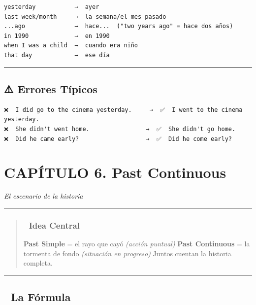 \documentclass[
  spanish,
  letterpaper,
]{scrbook}
\begin{document}
\begin{verbatim}
yesterday           →  ayer
last week/month     →  la semana/el mes pasado
...ago              →  hace...  ("two years ago" = hace dos años)
in 1990             →  en 1990
when I was a child  →  cuando era niño
that day            →  ese día
\end{verbatim}

\begin{center}\rule{0.5\linewidth}{0.5pt}\end{center}

\section{⚠️ Errores Típicos}\label{errores-tuxedpicos-2}

\begin{verbatim}
❌  I did go to the cinema yesterday.     →  ✅  I went to the cinema yesterday.
❌  She didn't went home.                →  ✅  She didn't go home.
❌  Did he came early?                   →  ✅  Did he come early?
\end{verbatim}

\chapter{CAPÍTULO 6. Past
Continuous}\label{capuxedtulo-6.-past-continuous}

\emph{El escenario de la historia}

\begin{center}\rule{0.5\linewidth}{0.5pt}\end{center}

\begin{quote}
\subsection{🎯 Idea Central}\label{idea-central-4}

\textbf{Past Simple} = el rayo que cayó \emph{(acción puntual)}
\textbf{Past Continuous} = la tormenta de fondo \emph{(situación en
progreso)} Juntos cuentan la historia completa.
\end{quote}

\begin{center}\rule{0.5\linewidth}{0.5pt}\end{center}

\section{📐 La Fórmula}\label{la-fuxf3rmula-2}
\end{document}
